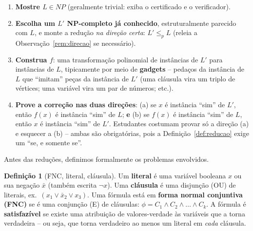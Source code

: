 \documentclass[9pt,a4paper]{extarticle}
\newcommand{\impt}[1]{\textcolor{important}{\textbf{#1}}}
\newcommand{\ntc}[1]{\textcolor{notice}{#1}}
\theoremstyle{definition}
\newtheorem{definition}{Definição}[section]
\begin{document}
\begin{enumerate}
\item \impt{Mostre \(L \in NP\)} (geralmente trivial: exiba o certificado e o verificador).
\item \impt{Escolha um \(L'\) NP-completo já conhecido}, estruturalmente parecido com \(L\), e monte a redução \emph{na direção certa}: \(L' \leq_p L\) (releia a Observação~\ref{rem:direcao} se necessário).
\item \impt{Construa \(f\)}: uma transformação polinomial de instâncias de \(L'\) para instâncias de \(L\), tipicamente por meio de \impt{gadgets} -- pedaços da instância de \(L\) que \enquote{imitam} peças da instância de \(L'\) (uma cláusula vira um triplo de vértices; uma variável vira um par de números; etc.).
\item \impt{Prove a correção nas duas direções}: (a) se \(x\) é instância \enquote{sim} de \(L'\), então \(f(x)\) é instância \enquote{sim} de \(L\); \textbf{e} (b) se \(f(x)\) é instância \enquote{sim} de \(L\), então \(x\) é instância \enquote{sim} de \(L'\). \ntc{Estudantes costumam provar só a direção (a) e esquecer a (b) -- ambas são obrigatórias, pois a Definição~\ref{def:reducao} exige um \enquote{se, e somente se}.}
\end{enumerate}

Antes das reduções, definimos formalmente os problemas envolvidos.

\begin{definition}[FNC, literal, cláusula]\label{def:fnc}
Um \impt{literal} é uma variável booleana \(x\) ou sua negação \(\bar x\) (também escrita \(\neg x\)). Uma \impt{cláusula} é uma disjunção (OU) de literais, ex.\ \((x_1 \vee \bar x_2 \vee x_3)\). Uma fórmula está em \impt{forma normal conjuntiva (FNC)} se é uma conjunção (E) de cláusulas: \(\phi = C_1 \wedge C_2 \wedge \dots \wedge C_k\). A fórmula é \impt{satisfazível} se existe uma atribuição de valores-verdade às variáveis que a torna verdadeira -- ou seja, que torna verdadeiro ao menos um literal em \emph{cada} cláusula.
\end{definition}
\end{document}
